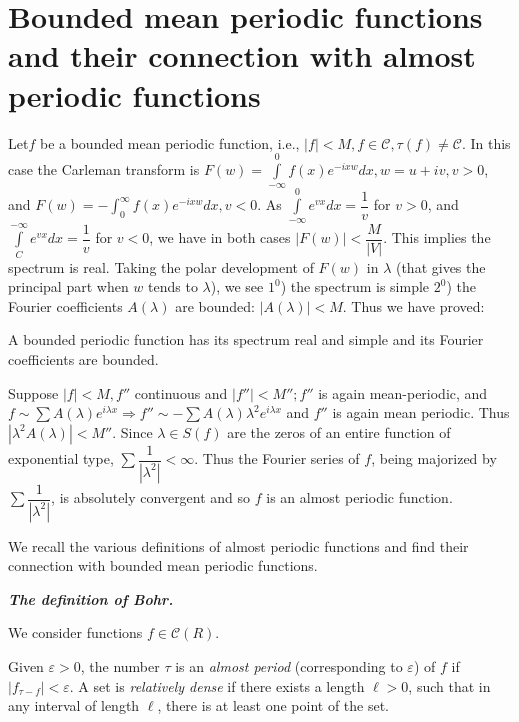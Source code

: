 \chapter[Bounded mean periodic functions and their...]{Bounded mean periodic functions and their
 connection with almost periodic functions}\label{chap7}%

Let\pageoriginale $f$ be a bounded mean periodic function, i.e., $|f|<M, f \in
\mathscr{C}, \tau(f) \neq \mathscr{C}$. In this case the
Carleman transform is $F(w) = \int\limits_{-\infty}^0 f (x)
e^{-ixw}dx, w = u + iv, v > 0$, and $F(w) = -\int_0^\infty
f(x)e^{-ixw} dx, v< 0.$ As $\int\limits_{-\infty}^0 e^{vx}dx =
\dfrac{1}{v}$ for $v>0$, and $\int\limits_C^{-\infty} e^{vx}dx=\dfrac{1}{v}$
for $ v<0$, we have in both cases $|F(w)|< \dfrac{M}{|V|}$. This
implies the spectrum is real. Taking the polar development of $F (w)$
in $\lambda$ (that gives the principal part when $w$ tends to
$\lambda$), we see $1^{0}$) the spectrum is simple $2^{0}$) the
Fourier coefficients $A(\lambda)$ are bounded: $|A(\lambda)| <
M$. Thus we have proved: 
\begin{theorem*}%
 A bounded periodic function has its spectrum real and simple and its
 Fourier coefficients are bounded. 
\end{theorem*}

Suppose $|f|<M, f''$ continuous and $|f''|<M''; f''$ is again
mean-periodic, and $f \sim \sum A (\lambda)e^{i \lambda x}\Rightarrow
f'' \sim - \sum A(\lambda)\lambda^2 e^{i \lambda x}$ and $f''$ is again
mean periodic. Thus $|\lambda^2 A(\lambda)| < M''$. Since $\lambda \in
S(f)$ are the zeros of an entire function of exponential type, $\sum
\dfrac{1}{|\lambda^2|}< \infty$. Thus the Fourier series of $f$, being
majorized by $\sum \dfrac{1}{|\lambda^2|}$, is absolutely convergent
and so $f$ is an almost periodic function. 

We recall the various definitions of almost periodic functions and
find their connection with bounded mean periodic functions. 

\medskip
\textbf{\textit{The definition of Bohr.}}\pageoriginale

We consider functions $f \in \mathscr{C} (R)$.
\begin{defi*}[(Bohr)]%
 Given $\varepsilon > 0$, the number $\tau$ is an
 \textit{almost period} (corresponding to $\varepsilon$) of $f$ if
 $\big|f_{\tau-f}\big| < \varepsilon$. A set is
 \textit{relatively dense} if there exists a length $\ell > 0$, such
 that in any interval of length $\ell$, there is at least one point
 of the set. 
\end{defi*}

